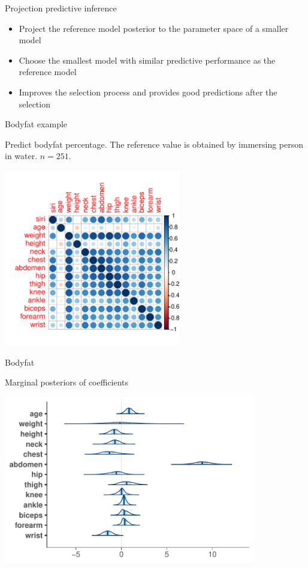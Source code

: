 \documentclass[english,t]{beamer}
\begin{document}
\begin{frame}{Projection predictive inference}

  \begin{itemize}
  \item Project the reference model posterior to the parameter space
    of a smaller model
  \item Choose the smallest model with similar predictive performance
    as the reference model
  \item<2-> Improves the selection process and provides good predictions
    after the selection
  \end{itemize}

\end{frame}

\begin{frame}{Bodyfat example}

  \vspace{-0.55\baselineskip}
  Predict bodyfat percentage. The reference value is obtained by
  immersing person in water. $n=251$.

  \pause
  \vspace{-0.7\baselineskip}
  \includegraphics[width=7.7cm]{bodyfat_corr.pdf}

\end{frame}

\begin{frame}{Bodyfat}

  \vspace{-0.55\baselineskip}
  Marginal posteriors of coefficients
  
  \includegraphics[width=11cm]{bodyfat_mcmc_areas.pdf}

\end{frame}
\end{document}
